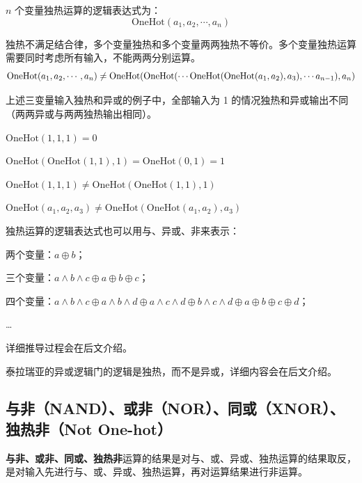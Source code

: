 $n$ 个变量独热运算的逻辑表达式为：
$$\mathrm{OneHot}(a_1, a_2, \cdots , a_n)$$

\begin{remark}{}{}
  独热不满足结合律，多个变量独热和多个变量两两独热不等价。多个变量独热运算需要同时考虑所有输入，不能两两分别运算。
  $$\mathrm{OneHot}(a_1, a_2, \cdots, a_n) \neq \\ \mathrm{OneHot}(\mathrm{OneHot}( \cdots \mathrm{OneHot}(\mathrm{OneHot}(a_1, a_2), a_3), \cdots a_{n - 1}), a_n)$$
  \begin{example}{}{}
    上述三变量输入独热和异或的例子中，全部输入为 1 的情况独热和异或输出不同（两两异或与两两独热输出相同）。

    $\mathrm{OneHot}(1, 1, 1) = 0$

    $\mathrm{OneHot}(\mathrm{OneHot}(1, 1), 1) = \mathrm{OneHot}(0, 1) = 1$

    $\mathrm{OneHot}(1, 1, 1) \neq \mathrm{OneHot}(\mathrm{OneHot}(1, 1), 1)$

    $\mathrm{OneHot}(a_1, a_2, a_3) \neq \mathrm{OneHot}(\mathrm{OneHot}(a_1, a_2), a_3)$
  \end{example}
\end{remark}

\begin{note}{}{}
  独热运算的逻辑表达式也可以用与、异或、非来表示：

  两个变量：$a \oplus b$；

  三个变量：$a \land b \land c \oplus a \oplus b \oplus c$；

  四个变量：$a \land b \land c \oplus a \land b \land d \oplus a \land c \land d \oplus b \land c \land d \oplus a \oplus b \oplus c \oplus d$；

  \dots

  详细推导过程会在后文介绍。
\end{note}

\begin{note}{}{}
  泰拉瑞亚的异或逻辑门的逻辑是独热，而不是异或，详细内容会在后文介绍。
\end{note}

\subsection{与非（NAND）、或非（NOR）、同或（XNOR）、独热非（Not One-hot）}

\textbf{与非、或非、同或、独热非}运算的结果是对与、或、异或、独热运算的结果取反，是对输入先进行与、或、异或、独热运算，再对运算结果进行非运算。

